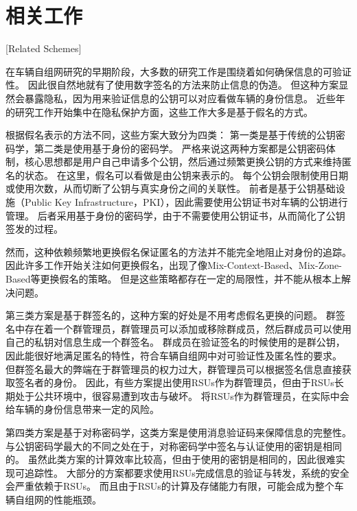 \section{相关工作}[Related Schemes]

在车辆自组网研究的早期阶段，大多数的研究工作是围绕着如何确保信息的可验证性。
因此很自然地就有了使用数字签名的方法来防止信息的伪造\cite{el2002security}。
但这种方案显然会暴露隐私，因为用来验证信息的公钥可以对应看做车辆的身份信息\cite{petit2015pseudonym,da2012examining}。
近些年的研究工作开始集中在隐私保护方面，这些工作大多是基于假名的方式。

根据假名表示的方法不同，这些方案大致分为四类\cite{petit2015pseudonym}：
第一类是基于传统的公钥密码学，第二类是使用基于身份的密码学。
严格来说这两种方案都是公钥密码体制，核心思想都是用户自己申请多个公钥，然后通过频繁更换公钥的方式来维持匿名的状态。
在这里，假名可以看做是由公钥来表示的。
每个公钥会限制使用日期或使用次数，从而切断了公钥与真实身份之间的关联性。
前者是基于公钥基础设施（Public Key Infrastructure，PKI），因此需要使用公钥证书对车辆的公钥进行管理。
后者采用基于身份的密码学，由于不需要使用公钥证书，从而简化了公钥签发的过程。

然而，这种依赖频繁地更换假名保证匿名的方法并不能完全地阻止对身份的追踪\cite{wiedersheim2010privacy}。
因此许多工作开始关注如何更换假名，出现了像Mix-Context-Based、Mix-Zone-Based\cite{jemaa2017study,ying2013dynamic,lu2012pseudonym}等更换假名的策略。
但是这些策略都存在一定的局限性，并不能从根本上解决问题。

第三类方案是基于群签名的，这种方案的好处是不用考虑假名更换的问题。
群签名中存在着一个群管理员，群管理员可以添加或移除群成员，然后群成员可以使用自己的私钥对信息生成一个群签名。
群成员在验证签名的时候使用的是群公钥，因此能很好地满足匿名的特性，符合车辆自组网中对可验证性及匿名性的要求。
但群签名最大的弊端在于群管理员的权力过大，群管理员可以根据签名信息直接获取签名者的身份。
因此，有些方案提出使用RSUs作为群管理员\cite{hao2011distributed,park2011rsu}，但由于RSUs长期处于公共环境中，很容易遭到攻击与破坏。
将RSUs作为群管理员，在实际中会给车辆的身份信息带来一定的风险。

第四类方案是基于对称密码学，这类方案是使用消息验证码来保障信息的完整性\cite{petit2015pseudonym,choi2005balancing}。
与公钥密码学最大的不同之处在于，对称密码学中签名与认证使用的密钥是相同的。
虽然此类方案的计算效率比较高，但由于使用的密钥是相同的，因此很难实现可追踪性。
大部分的方案都要求使用RSUs完成信息的验证与转发，系统的安全会严重依赖于RSUs。
而且由于RSUs的计算及存储能力有限，可能会成为整个车辆自组网的性能瓶颈。

